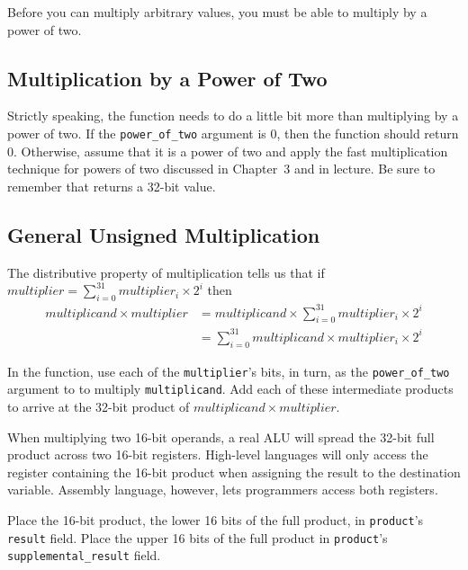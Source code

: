Before you can multiply arbitrary values, you must be able to multiply by a power of two.

\subsection{Multiplication by a Power of Two}

Strictly speaking, the  function needs to do a little bit more than multiplying by a power of two.
If the \lstinline{power_of_two} argument is 0, then the function should return 0.
Otherwise, assume that it is a power of two and apply the fast multiplication technique for powers of two discussed in Chapter~3 and in lecture.
Be sure to remember that  returns a 32-bit value.


\subsection{General Unsigned Multiplication}

The distributive property of multiplication tells us that if $multiplier = \sum_{i=0}^{31}multiplier_i \times 2^i$ then
\begin{align*}
    multiplicand \times multiplier  & = multiplicand \times \sum_{i=0}^{31}multiplier_i \times 2^i \\
                                    & = \sum_{i=0}^{31} multiplicand \times multiplier_i \times 2^i
\end{align*}

In the  function, use each of the \lstinline{multiplier}'s bits, in turn, as the \lstinline{power_of_two} argument to  to multiply \lstinline{multiplicand}.
Add each of these intermediate products to arrive at the 32-bit product of $multiplicand \times multiplier$.

When multiplying two 16-bit operands, a real ALU will spread the 32-bit full product across two 16-bit registers.
High-level languages will only access the register containing the 16-bit product when assigning the result to the destination variable.
Assembly language, however, lets programmers access both registers.

Place the 16-bit product, the lower 16 bits of the full product, in \lstinline{product}'s \lstinline{result} field.
Place the upper 16 bits of the full product in \lstinline{product}'s \lstinline{supplemental_result} field.


